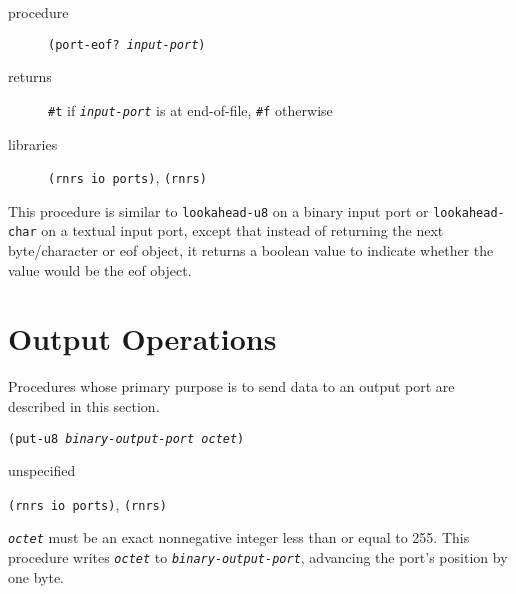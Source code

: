 \begin{description}

\label{io_s68}\item[procedure] \texttt{(port-eof? \textit{input-port})}



\item[returns] \texttt{\#{}t} if \texttt{\textit{input-port}} is at end-of-file, \texttt{\#{}f} otherwise


\item[libraries] \texttt{(rnrs io ports)}, \texttt{(rnrs)}
\end{description}


This procedure is similar to \texttt{lookahead-u8} on a binary input port
or \texttt{lookahead-char} on a textual input port, except that instead
of returning the next byte/character or eof object, it returns a boolean
value to indicate whether the value would be the eof object.



\section{\label{io_g129}\label{io_h8}Output Operations\label{io_SECTOUTPUT}}



Procedures whose primary purpose is to send data to an output port
are described in this section.

\begin{description}

\label{io_s69}\item[procedure] \texttt{(put-u8 \textit{binary-output-port} \textit{octet})}



\item[returns] unspecified


\item[libraries] \texttt{(rnrs io ports)}, \texttt{(rnrs)}
\end{description}

\texttt{\textit{octet}} must be an exact nonnegative integer less than or equal to 255.
This procedure writes \texttt{\textit{octet}} to \texttt{\textit{binary-output-port}}, advancing
the port's position by one byte.


